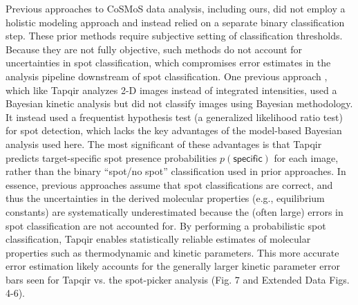 

Previous approaches to CoSMoS data analysis, including ours, did not employ a holistic modeling approach and instead relied on a separate binary classification step.  These prior methods require subjective setting of classification thresholds.  Because they are not fully objective, such methods do not account for uncertainties in spot classification, which compromises error estimates in the analysis pipeline downstream of spot classification. One previous approach \cite{Smith2019-yb,Smith2015-gf}, which like Tapqir analyzes 2-D images instead of integrated intensities, used a Bayesian kinetic analysis but did not classify images using Bayesian methodology. It instead used a frequentist hypothesis test (a generalized likelihood ratio test) for spot detection, which lacks the key advantages of the model-based Bayesian analysis used here.  The most significant of these advantages is that Tapqir predicts target-specific spot presence probabilities $p(\mathsf{specific})$ for each image, rather than the binary ``spot/no spot'' classification used in prior approaches. In essence, previous approaches assume that spot classifications are correct, and thus the uncertainties in the derived molecular properties (e.g., equilibrium constants) are systematically underestimated because the (often large) errors in spot classification are not accounted for. By performing a probabilistic spot classification, Tapqir enables statistically reliable estimates of molecular properties such as thermodynamic and kinetic parameters.  This more accurate error estimation likely accounts for the generally larger kinetic parameter error bars seen for Tapqir vs. the spot-picker analysis (Fig. 7 and Extended Data Figs. 4-6).


